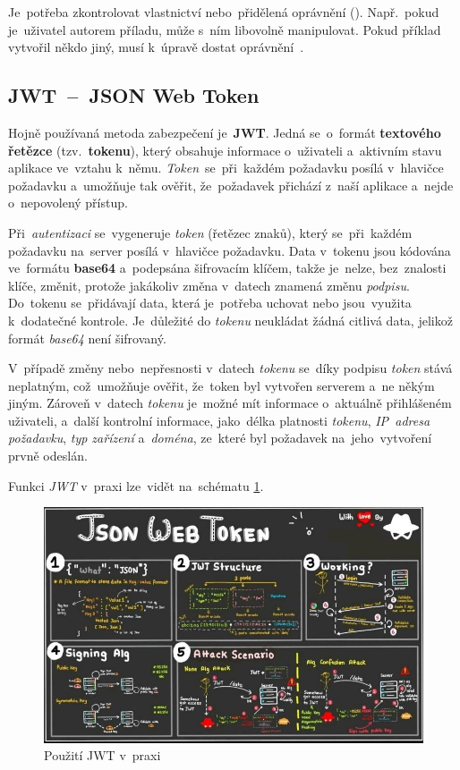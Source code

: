 \documentclass[11pt,a4paper]{report}
\begin{document}
                Je~potřeba zkontrolovat vlastnictví nebo~přidělená oprávnění (). Např.~pokud je~uživatel autorem příladu, může s~ním libovolně manipulovat. Pokud příklad vytvořil někdo jiný, musí k~úpravě dostat oprávnění~\cite{graham2021ethical}.

            \subsection{JWT~--~JSON Web Token}
                Hojně používaná metoda zabezpečení je~\textbf{JWT}. Jedná se~o~formát \textbf{textového řetězce} (tzv.~\textbf{tokenu}), který obsahuje informace o~uživateli a~aktivním stavu aplikace ve~vztahu k~němu. \emph{Token}~se~při~každém požadavku posílá v~hlavičce požadavku a~umožňuje tak ověřit, že~požadavek přichází z~naší aplikace a~nejde o~nepovolený přístup.
                
                Při~\emph{autentizaci} se~vygeneruje \emph{token} (řetězec znaků), který se~při~každém požadavku na~server posílá v~hlavičce požadavku. Data v~tokenu jsou kódována ve~formátu \textbf{base64} a~podepsána šifrovacím klíčem, takže je~nelze, bez~znalosti klíče, změnit, protože jakákoliv změna v~datech znamená změnu \emph{podpisu}. Do~tokenu se~přidávají data, která je~potřeba uchovat nebo jsou~využita k~dodatečné kontrole. Je~důležité do \emph{tokenu} neukládat žádná citlivá data, jelikož formát \emph{base64} není šifrovaný. 
                
                V~případě změny nebo~nepřesnosti v~datech \emph{tokenu} se~díky podpisu \emph{token} stává neplatným, což~umožňuje ověřit, že~token byl vytvořen serverem a~ne někým jiným. Zároveň v~datech \emph{tokenu} je~možné mít informace o~aktuálně přihlášeném uživateli, a~další kontrolní informace, jako~délka platnosti \emph{tokenu}, \emph{IP~adresa požadavku}, \emph{typ zařízení} a~\emph{doména}, ze~které byl požadavek na~jeho~vytvoření prvně odeslán.

                Funkci \emph{JWT} v~praxi lze~vidět na~schématu \ref{model-jwt}.

                \begin{figure}
                    \centering
                    \includegraphics[width=.9\linewidth]{./files/img/jwt.jpg}
                    \caption{Použití JWT v~praxi}
                    \label{model-jwt}
                \end{figure}
\end{document}
